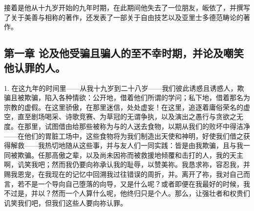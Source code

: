 

\section{}

接着是他从十九岁开始的九年时期，在此期间他失去了一位朋友，皈依了，并撰写了关于美善与相称的著作，还发表了一部关于自由技艺以及亚里士多德范畴论的著作。\par


\subsection{第一章 论及他受骗且骗人的至不幸时期，并论及嘲笑他认罪的人。}

1. 在这九年的时间里——从我十九岁到二十八岁——我们彼此诱惑且诱惑人，欺骗且被欺骗，陷入各种情欲：公开地，借着他们所谓的学问；私下地，借着那名为宗教的虚假。在这里骄傲，在那里迷信，处处虚妄！在这里，追逐着庸俗荣名的虚空，直至剧场喝采、诗歌竞赛、为草冠的无谓争执，以及演出之愚行与贪欲之无度。在那里，试图借由给那些被称为与的人送去食物，以期从我们的败坏中得洁净——在他们的胃脏工场中，这些食物将为我们制造出天使和神明，好使我们借之获得解救——我热切地随从这些事，并与友人们一同实践：皆是由我欺骗，且与我一同被欺骗。任那高傲之辈，以及尚未因祢而被救援地倾覆和击打的人，我的天主啊，讥笑我吧；然而我仍要向祢承认我的耻辱，以赞美祢。我恳求祢，容忍我，并赐我恩宠，在我现在的记忆中回溯我过往错误的周折，并。离开了祢，我对自己而言，若不是一个导向自己堕落的向导，又是什么呢？或者即便在我最好的时候，我不过是，并以？然而一个人算什么呢，他终归只是个人。那么，让强壮者和权贵们讥笑我们吧，但我们这些人要向祢认罪。\par


